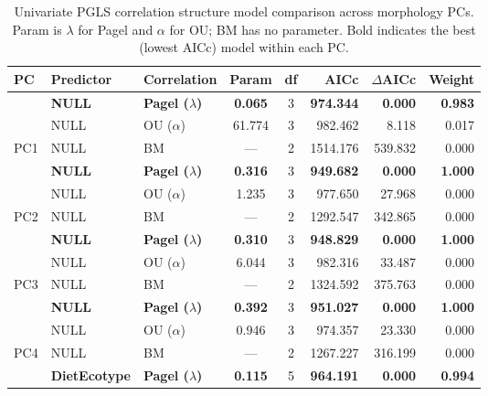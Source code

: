 \begin{table}[!h]
\centering
\caption{\label{tab:tab:color_corr_model_comparison_combined}Univariate PGLS correlation structure model comparison across morphology PCs. Param is $\lambda$ for Pagel and $\alpha$ for OU; BM has no parameter. Bold indicates the best (lowest AICc) model within each PC.}
\centering
\begin{tabular}[t]{lllccrrr}
\toprule
PC & Predictor & Correlation & Param & df & AICc & $\Delta$AICc & Weight\\
\midrule
 & \textbf{NULL} & \textbf{Pagel ($\lambda$)} & \textbf{0.065} & 3 & \textbf{974.344} & \textbf{0.000} & \textbf{0.983}\\

 & NULL & OU ($\alpha$) & 61.774 & 3 & 982.462 & 8.118 & 0.017\\

\multirow{-3}{*}{\raggedright\arraybackslash PC1} & NULL & BM & --- & 2 & 1514.176 & 539.832 & 0.000\\
\cmidrule{1-8}
 & \textbf{NULL} & \textbf{Pagel ($\lambda$)} & \textbf{0.316} & 3 & \textbf{949.682} & \textbf{0.000} & \textbf{1.000}\\

 & NULL & OU ($\alpha$) & 1.235 & 3 & 977.650 & 27.968 & 0.000\\

\multirow{-3}{*}{\raggedright\arraybackslash PC2} & NULL & BM & --- & 2 & 1292.547 & 342.865 & 0.000\\
\cmidrule{1-8}
 & \textbf{NULL} & \textbf{Pagel ($\lambda$)} & \textbf{0.310} & 3 & \textbf{948.829} & \textbf{0.000} & \textbf{1.000}\\

 & NULL & OU ($\alpha$) & 6.044 & 3 & 982.316 & 33.487 & 0.000\\

\multirow{-3}{*}{\raggedright\arraybackslash PC3} & NULL & BM & --- & 2 & 1324.592 & 375.763 & 0.000\\
\cmidrule{1-8}
 & \textbf{NULL} & \textbf{Pagel ($\lambda$)} & \textbf{0.392} & 3 & \textbf{951.027} & \textbf{0.000} & \textbf{1.000}\\

 & NULL & OU ($\alpha$) & 0.946 & 3 & 974.357 & 23.330 & 0.000\\

\multirow{-3}{*}{\raggedright\arraybackslash PC4} & NULL & BM & --- & 2 & 1267.227 & 316.199 & 0.000\\
\cmidrule{1-8}
 & \textbf{DietEcotype} & \textbf{Pagel ($\lambda$)} & \textbf{0.115} & 5 & \textbf{964.191} & \textbf{0.000} & \textbf{0.994}\\


\end{tabular}
\end{table}
